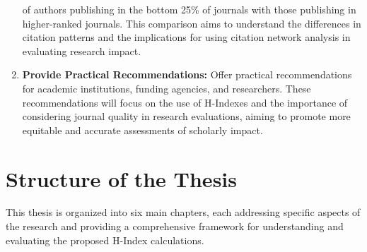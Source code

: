 \begin{enumerate}
          of authors publishing in the bottom 25\% of journals with those publishing in higher-ranked journals.
          This comparison aims to understand the differences in citation patterns and the implications for using
          citation network analysis in evaluating research impact.
    \item \textbf{Provide Practical Recommendations:} Offer practical recommendations for academic institutions,
          funding agencies, and researchers. These recommendations will focus on the use of H-Indexes and the importance of
          considering journal quality in research evaluations, aiming to promote more equitable and accurate assessments of scholarly impact.
\end{enumerate}

\section{Structure of the Thesis}
This thesis is organized into six main chapters, each addressing specific
aspects of the research and providing a comprehensive framework for
understanding and evaluating the proposed H-Index calculations.
